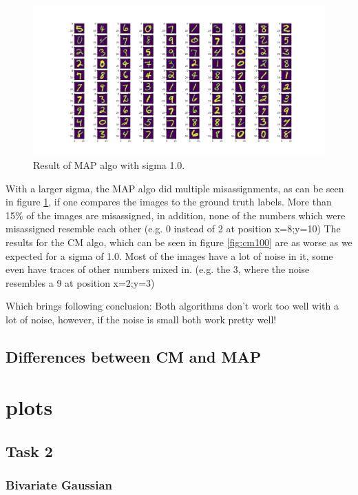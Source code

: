 \documentclass{article}
\begin{document}
\begin{figure}[h]
  \includegraphics[width=\linewidth]{sigma_100_map.png}
  \caption{Result of MAP algo with sigma 1.0.}
  \label{fig:map100}
\end{figure}

With a larger sigma, the MAP algo did multiple misassignments, as can be seen in figure \ref{fig:map100}, if one compares the images to the ground truth labels. More than 15\% of the images are misassigned, in addition, none of the numbers which were misassigned resemble each other (e.g. 0 instead of 2 at position x=8;y=10)
The results for the CM algo, which can be seen in figure \ref{fig:cm100} are as worse as we expected for a sigma of 1.0. Most of the images have a lot of noise in it, some even have traces of other numbers mixed in. (e.g. the 3, where the noise resembles a 9 at position x=2;y=3)

Which brings following conclusion: Both algorithms don't work too well with a lot of noise, however, if the noise is small both work pretty well!
\pagebreak

\subsection{Differences between CM and MAP}

\clearpage
\section{plots}
\label{plots}
\subsection{Task 2}
\subsubsection{Bivariate Gaussian}
\end{document}
